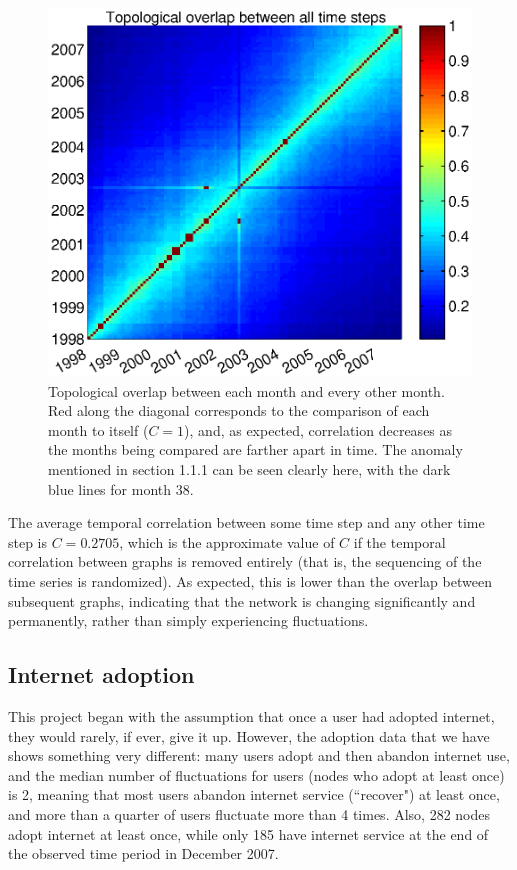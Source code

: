 \documentclass[12pt]{article}
\begin{document}
\begin{figure}[H]
\includegraphics[trim=1cm 1cm 1cm 1cm, clip=true, width = .95\textwidth]{Graficos/overlap.eps}
\caption{Topological overlap between each month and every other month. Red along the diagonal corresponds to the comparison of each month to itself (\(C = 1\)), and, as expected, correlation decreases as the months being compared are farther apart in time. The anomaly mentioned in section 1.1.1 can be seen clearly here, with the dark blue lines for month 38.}
\label{fig:overlap}
\end{figure}

The average temporal correlation between some time step and any other time step is \(C = 0.2705\), which is the approximate value of \(C\) if the temporal correlation between graphs is removed entirely (that is, the sequencing of the time series is randomized). As expected, this is lower than the overlap between subsequent graphs, indicating that the network is changing significantly and permanently, rather than simply experiencing fluctuations.

\subsection{Internet adoption}

This project began with the assumption that once a user had adopted internet, they would rarely, if ever, give it up. However, the adoption data that we have shows something very different: many users adopt and then abandon internet use, and the median number of fluctuations for users (nodes who adopt at least once) is 2, meaning that most users abandon internet service (``recover") at least once, and more than a quarter of users fluctuate more than 4 times. Also, 282 nodes adopt internet at least once, while only 185 have internet service at the end of the observed time period in December 2007.
\end{document}
